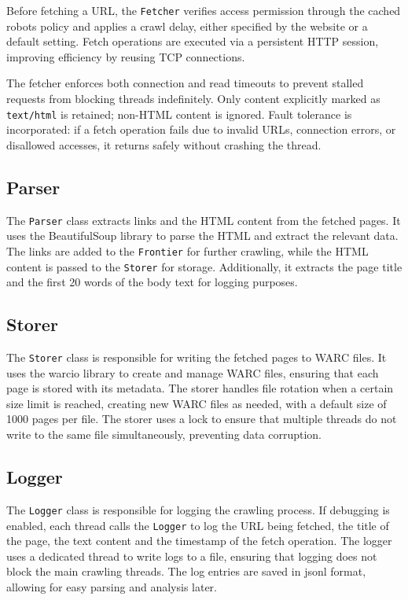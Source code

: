 \documentclass[sigconf]{acmart}
\begin{document}
Before fetching a URL, the \texttt{Fetcher} verifies access permission through the cached robots policy and applies a crawl delay, either specified by the website or a default setting. Fetch operations are executed via a persistent HTTP session, improving efficiency by reusing TCP connections.

The fetcher enforces both connection and read timeouts to prevent stalled requests from blocking threads indefinitely. Only content explicitly marked as \texttt{text/html} is retained; non-HTML content is ignored. Fault tolerance is incorporated: if a fetch operation fails due to invalid URLs, connection errors, or disallowed accesses, it returns safely without crashing the thread.

\subsection{Parser}
The \texttt{Parser} class extracts links and the HTML content from the fetched pages. It uses the BeautifulSoup library to parse the HTML and extract the relevant data. The links are added to the \texttt{Frontier} for further crawling, while the HTML content is passed to the \texttt{Storer} for storage. Additionally, it extracts the page title and the first 20 words of the body text for logging purposes.

\subsection{Storer}
The \texttt{Storer} class is responsible for writing the fetched pages to WARC files. It uses the warcio library to create and manage WARC files, ensuring that each page is stored with its metadata. The storer handles file rotation when a certain size limit is reached, creating new WARC files as needed, with a default size of 1000 pages per file. The storer uses a lock to ensure that multiple threads do not write to the same file simultaneously, preventing data corruption.

\subsection{Logger}
The \texttt{Logger} class is responsible for logging the crawling process. If debugging is enabled, each thread calls the \texttt{Logger} to log the URL being fetched, the title of the page, the text content and the timestamp of the fetch operation. The logger uses a dedicated thread to write logs to a file, ensuring that logging does not block the main crawling threads. The log entries are saved in jsonl format, allowing for easy parsing and analysis later.
\end{document}
